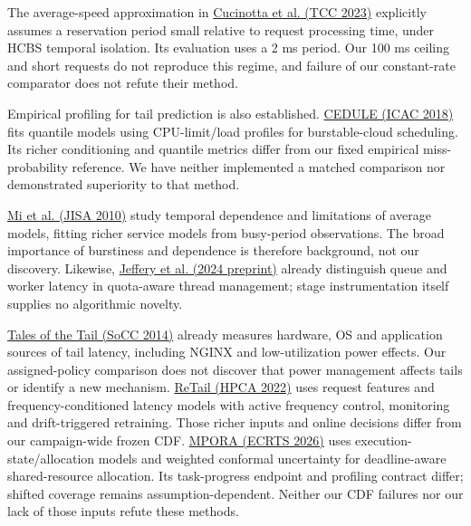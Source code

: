 \documentclass[11pt,a4paper]{article}
\begin{document}
The average-speed approximation in
\href{https://retis.santannapisa.it/people/nino/publication/TCC23.pdf}{Cucinotta et al. (TCC 2023)}
explicitly assumes a reservation period small relative to request processing
time, under HCBS temporal isolation. Its evaluation uses a 2 ms period. Our
100 ms ceiling and short requests do not reproduce this regime, and failure
of our constant-rate comparator does not refute their method.

Empirical profiling for tail prediction is also established.
\href{https://www2.cs.uh.edu/~fyan/Paper/Feng-ICAC18.pdf}{CEDULE (ICAC 2018)}
fits quantile models using CPU-limit/load profiles for burstable-cloud
scheduling. Its richer conditioning and quantile metrics differ from our
fixed empirical miss-probability reference. We have neither implemented a
matched comparison nor demonstrated superiority to that method.

\href{https://link.springer.com/content/pdf/10.1007/s13174-010-0012-9.pdf}{Mi et al. (JISA 2010)}
study temporal dependence and limitations of average models, fitting richer
service models from busy-period observations. The broad importance of
burstiness and dependence is therefore background, not our discovery.
Likewise, \href{https://arxiv.org/html/2407.11582v1}{Jeffery et al. (2024 preprint)}
already distinguish queue and worker latency in quota-aware thread management;
stage instrumentation itself supplies no algorithmic novelty.

\href{https://syslab.cs.washington.edu/papers/latency-socc14.pdf}{Tales of the Tail (SoCC 2014)} \cite{tales}
already measures hardware, OS and application sources of tail latency, including
NGINX and low-utilization power effects. Our assigned-policy comparison does
not discover that power management affects tails or identify a new mechanism.
\href{https://people.csail.mit.edu/delimitrou/papers/2022.hpca.retail.pdf}{ReTail (HPCA 2022)} \cite{retail}
uses request features and frequency-conditioned latency models with active
frequency control, monitoring and drift-triggered retraining. Those richer
inputs and online decisions differ from our campaign-wide frozen CDF.
\href{https://drops.dagstuhl.de/storage/00lipics/lipics-vol375-ecrts2026/html/LIPIcs.ECRTS.2026.17/LIPIcs.ECRTS.2026.17.html}{MPORA (ECRTS 2026)} \cite{mpora}
uses execution-state/allocation models and weighted conformal uncertainty for
deadline-aware shared-resource allocation. Its task-progress endpoint and
profiling contract differ; shifted coverage remains assumption-dependent.
Neither our CDF failures nor our lack of those inputs refute these methods.
\end{document}
